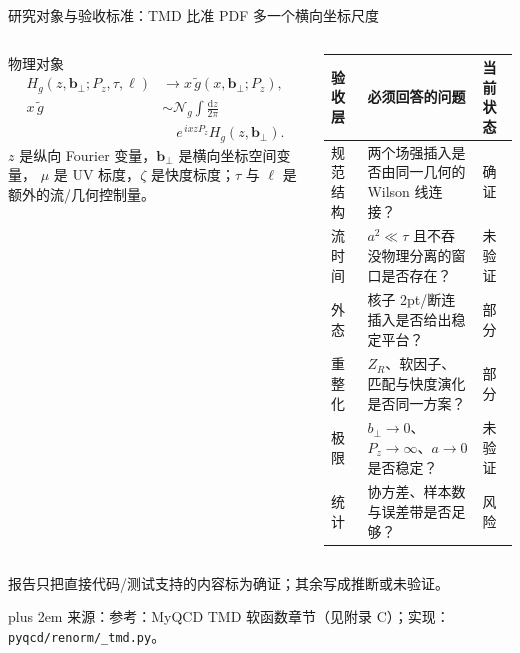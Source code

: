 \documentclass[UTF8,aspectratio=169,11pt]{ctexbeamer}
\newcommand{\source}[1]{%
  \par\vspace{0.02em}\begingroup\fontsize{6}{6.8}\selectfont\raggedright\sloppy
  \setlength{\emergencystretch}{3em}\rightskip=0pt plus 2em
  \color{muted}来源：#1\par\endgroup}
\newcommand{\verified}{\textcolor{evidence}{确证}}
\newcommand{\unverified}{\textcolor{warning}{未验证}}
\newcommand{\dd}{\mathrm{d}}
\begin{document}
\begin{frame}[t]{研究对象与验收标准：TMD 比准 PDF 多一个横向坐标尺度}
  \begin{columns}[T,totalwidth=\textwidth]
    \begin{column}{0.46\textwidth}
      \begin{block}{物理对象}
        \begin{align*}
          H_g(z,\boldsymbol b_\perp;P_z,\tau,\ell)
          &\longrightarrow
          x\,\widetilde g(x,\boldsymbol b_\perp;P_z),\\[-0.2em]
          x\,\widetilde g
          &\sim \mathcal N_g\int\frac{\dd z}{2\pi}\\[-0.2em]
          &\quad e^{\,ixzP_z}H_g(z,\boldsymbol b_\perp).
        \end{align*}
        \(z\) 是纵向 Fourier 变量，\(\boldsymbol b_\perp\) 是横向坐标空间变量，
        \(\mu\) 是 UV 标度，\(\zeta\) 是快度标度；\(\tau\) 与 \(\ell\) 是额外的流/几何控制量。
      \end{block}
    \end{column}
    \begin{column}{0.48\textwidth}
      \small
      \begin{tabularx}{\linewidth}{@{}lYl@{}}
        \toprule
        验收层 & 必须回答的问题 & 当前状态\\
        \midrule
        规范结构 & 两个场强插入是否由同一几何的 Wilson 线连接？ & \verified\\
        流时间 & \(a^2\ll\tau\) 且不吞没物理分离的窗口是否存在？ & \unverified\\
        外态 & 核子 2pt/断连插入是否给出稳定平台？ & 部分\\
        重整化 & \(Z_R\)、软因子、匹配与快度演化是否同一方案？ & 部分\\
        极限 & \(b_\perp\to0\)、\(P_z\to\infty\)、\(a\to0\) 是否稳定？ & \unverified\\
        统计 & 协方差、样本数与误差带是否足够？ & 风险\\
        \bottomrule
      \end{tabularx}
    \end{column}
  \end{columns}
  \vfill
  \textcolor{warning}{报告只把直接代码/测试支持的内容标为确证；其余写成推断或未验证。}
  \source{参考：MyQCD TMD 软函数章节（见附录 C）；实现：\nolinkurl{pyqcd/renorm/_tmd.py}。}
\end{frame}
\end{document}
